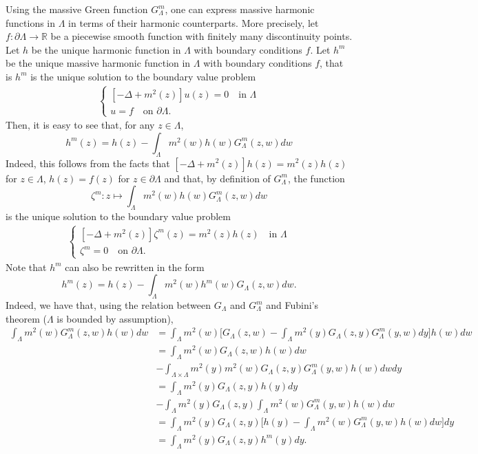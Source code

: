 \documentclass{article}
\theoremstyle{definition}
\theoremstyle{remark}
\theoremstyle{remark}
\begin{document}
Using the massive Green function $G_{\Lambda}^{m}$, one can express massive harmonic functions in $\Lambda$ in terms of their harmonic counterparts. More precisely, let $f: \partial \Lambda \to \mathbb{R}$ be a piecewise smooth function with finitely many discontinuity points. Let $h$ be the unique harmonic function in $\Lambda$ with boundary conditions $f$. Let $h^m$ be the unique massive harmonic function in $\Lambda$ with boundary conditions $f$, that is $h^m$ is the unique solution to the boundary value problem
\begin{align*}
    \begin{cases}
    [-\Delta + m^2(z)]u(z) = 0 \quad \text{in $\Lambda$} \\
    u=f \quad \text{on $\partial \Lambda$}.
    \end{cases}
\end{align*}
Then, it is easy to see that, for any $z \in \Lambda$,
\begin{equation} \label{harm_mass}
    h^m(z) = h(z) - \int_{\Lambda} m^{2}(w) h(w)G_{\Lambda}^m(z,w)dw
\end{equation}
Indeed, this follows from the facts that $[-\Delta + m^2(z)]h(z) = m^{2}(z)h(z)$ for $z \in \Lambda$, $h(z)=f(z)$ for $z \in \partial \Lambda$ and that, by definition of $G_\Lambda^m$, the function
\begin{equation*}
    \zeta^m: z \mapsto \int_{\Lambda} m^{2}(w) h(w)G_{\Lambda}^m(z,w)dw
\end{equation*}
is the unique solution to the boundary value problem
\begin{align*}
    \begin{cases}
    [-\Delta +m^2(z)]\zeta^m(z) = m^{2}(z)h(z) \quad \text{in $\Lambda$} \\
    \zeta^m=0 \quad \text{on $\partial \Lambda$}.
    \end{cases}
\end{align*}
Note that $h^m$ can also be rewritten in the form
\begin{equation} \label{harm_mass_alt}
    h^m(z) = h(z) - \int_{\Lambda} m^{2}(w) h^m(w)G_{\Lambda}(z,w)dw.
\end{equation}
Indeed, we have that, using the relation between $G_{\Lambda}$ and $G_{\Lambda}^m$ and Fubini's theorem ($\Lambda$ is bounded by assumption),
\begin{align*}
    \int_{\Lambda} m^2(w)G_{\Lambda}^m(z,w)h(w) dw &= \int_{\Lambda} m^2(w) \bigg[ G_{\Lambda}(z,w) - \int_{\Lambda} m^2(y)G_{\Lambda}(z,y)G_{\Lambda}^m(y,w) dy \bigg]h(w) dw\\
    &= \int_{\Lambda} m^2(w)G_{\Lambda}(z,w)h(w) dw \\
    &- \int_{\Lambda \times \Lambda} m^2(y)m^2(w)G_{\Lambda}(z,y)G_{\Lambda}^m(y,w)h(w) dwdy \\
    &= \int_{\Lambda} m^2(y)G_{\Lambda}(z,y)h(y) dy \\
    &- \int_{\Lambda} m^2(y)G_{\Lambda}(z,y)\int_{\Lambda}m^2(w)G_{\Lambda}^m(y,w) h(w) dw \\
    &= \int_{\Lambda} m^2(y)G_{\Lambda}(z,y) \bigg[ h(y) - \int_{\Lambda}m^2(w)G_{\Lambda}^m(y,w) h(w) dw \bigg] dy \\
    &= \int_{\Lambda} m^2(y)G_{\Lambda}(z,y) h^m(y)dy.
\end{align*}
\end{document}
